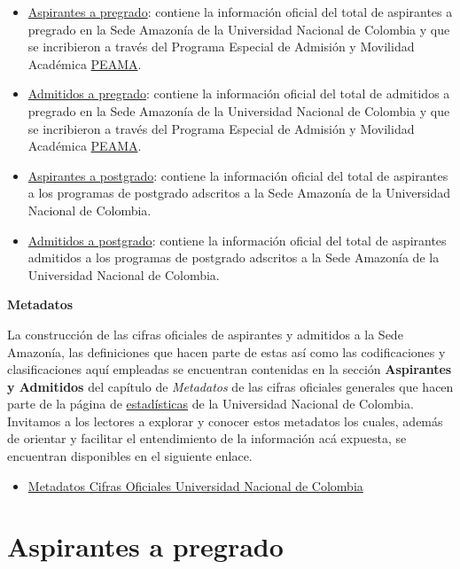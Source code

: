 \documentclass[
]{book}
\providecommand{\tightlist}{%
  \setlength{\itemsep}{0pt}\setlength{\parskip}{0pt}}
\begin{document}
\begin{itemize}
\item
  \protect\hyperlink{AspPre}{Aspirantes a pregrado}: contiene la información oficial del total de aspirantes a pregrado en la Sede Amazonía de la Universidad Nacional de Colombia y que se incribieron a través del Programa Especial de Admisión y Movilidad Académica \protect\hyperlink{peama}{PEAMA}.
\item
  \protect\hyperlink{AdmPre}{Admitidos a pregrado}: contiene la información oficial del total de admitidos a pregrado en la Sede Amazonía de la Universidad Nacional de Colombia y que se incribieron a través del Programa Especial de Admisión y Movilidad Académica \protect\hyperlink{peama}{PEAMA}.
\item
  \protect\hyperlink{AspPos}{Aspirantes a postgrado}: contiene la información oficial del total de aspirantes a los programas de postgrado adscritos a la Sede Amazonía de la Universidad Nacional de Colombia.
\item
  \protect\hyperlink{AdmPos}{Admitidos a postgrado}: contiene la información oficial del total de aspirantes admitidos a los programas de postgrado adscritos a la Sede Amazonía de la Universidad Nacional de Colombia.
\end{itemize}

\textbf{Metadatos}

La construcción de las cifras oficiales de aspirantes y admitidos a la Sede Amazonía, las definiciones que hacen parte de estas así como las codificaciones y clasificaciones aquí empleadas se encuentran contenidas en la sección \textbf{Aspirantes y Admitidos} del capítulo de \emph{Metadatos} de las cifras oficiales generales que hacen parte de la página de \href{http://estadisticas.unal.edu.co/home/}{estadísticas} de la Universidad Nacional de Colombia. Invitamos a los lectores a explorar y conocer estos metadatos los cuales, además de orientar y facilitar el entendimiento de la información acá expuesta, se encuentran disponibles en el siguiente enlace.

\begin{itemize}
\tightlist
\item
  \href{http://estadisticas.unal.edu.co/menu-principal/cifras-generales/metadatos/cifras-generales/}{Metadatos Cifras Oficiales Universidad Nacional de Colombia}
\end{itemize}

\hypertarget{AspPre}{%
\section{Aspirantes a pregrado}\label{AspPre}}
\end{document}
